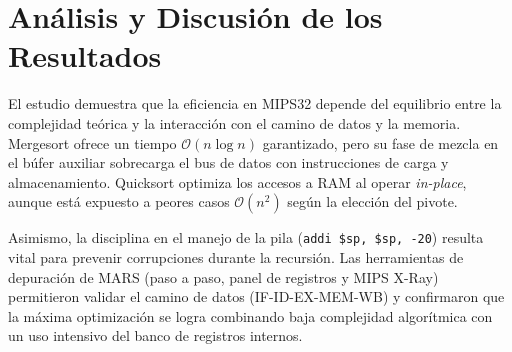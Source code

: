\documentclass[12pt,a4paper]{article}
\begin{document}
	
	\section{Análisis y Discusión de los Resultados}
	
	El estudio demuestra que la eficiencia en MIPS32 depende del equilibrio entre la complejidad teórica y la interacción con el camino de datos y la memoria. Mergesort ofrece un tiempo $\mathcal{O}(n \log n)$ garantizado, pero su fase de mezcla en el búfer auxiliar sobrecarga el bus de datos con instrucciones de carga y almacenamiento. Quicksort optimiza los accesos a RAM al operar \textit{in-place}, aunque está expuesto a peores casos $\mathcal{O}(n^2)$ según la elección del pivote.
	
	Asimismo, la disciplina en el manejo de la pila (\texttt{addi \$sp, \$sp, -20}) resulta vital para prevenir corrupciones durante la recursión. Las herramientas de depuración de MARS (paso a paso, panel de registros y MIPS X-Ray) permitieron validar el camino de datos (IF-ID-EX-MEM-WB) y confirmaron que la máxima optimización se logra combinando baja complejidad algorítmica con un uso intensivo del banco de registros internos.
	
\end{document}
